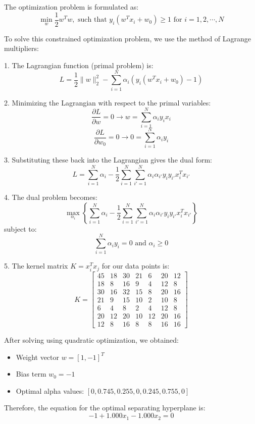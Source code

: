 \documentclass[12pt]{article}
\begin{document}
The optimization problem is formulated as:
\[
  \min_{w} \frac{1}{2}w^T w, \text{ such that } y_i(w^T x_i + w_0) \geq 1 \text{ for } i = 1,2,\cdots,N
\]

To solve this constrained optimization problem, we use the method of Lagrange multipliers:

1. The Lagrangian function (primal problem) is:
\[
  L = \frac{1}{2}\|w\|_2^2 - \sum_{i=1}^N \alpha_i(y_i(w^T x_i+w_0) - 1)
\]

2. Minimizing the Lagrangian with respect to the primal variables:
\[
  \frac{\partial L}{\partial w} = 0 \rightarrow w = \sum_{i=1}^N \alpha_i y_i x_i
\]
\[
  \frac{\partial L}{\partial w_0} = 0 \rightarrow 0 = \sum_{i=1}^N \alpha_i y_i
\]

3. Substituting these back into the Lagrangian gives the dual form:
\[
  L = \sum_{i=1}^N \alpha_i - \frac{1}{2}\sum_{i=1}^N\sum_{i'=1}^N \alpha_i\alpha_{i'}y_iy_{i'}x_i^T x_{i'}
\]

4. The dual problem becomes:
\[
  \max_{\alpha_i} \left\{\sum_{i=1}^N \alpha_i - \frac{1}{2}\sum_{i=1}^N\sum_{i'=1}^N \alpha_i\alpha_{i'}y_iy_{i'}x_i^T x_{i'}\right\}
\]
subject to:
\[
  \sum_{i=1}^N \alpha_i y_i = 0 \text{ and } \alpha_i \geq 0
\]

5. The kernel matrix \(K = x_i^T x_j\) for our data points is:
\[
  K = \begin{bmatrix}
    45 & 18 & 30 & 21 & 6  & 20 & 12 \\
    18 & 8  & 16 & 9  & 4  & 12 & 8  \\
    30 & 16 & 32 & 15 & 8  & 20 & 16 \\
    21 & 9  & 15 & 10 & 2  & 10 & 8  \\
    6  & 4  & 8  & 2  & 4  & 12 & 8  \\
    20 & 12 & 20 & 10 & 12 & 20 & 16 \\
    12 & 8  & 16 & 8  & 8  & 16 & 16
  \end{bmatrix}
\]

After solving using quadratic optimization, we obtained:
\begin{itemize}
  \item Weight vector \(w = [1, -1]^T\)
  \item Bias term \(w_0 = -1\)
  \item Optimal alpha values: $[0, 0.745,  0.255, 0, 0.245, 0.755, 0]$
\end{itemize}

Therefore, the equation for the optimal separating hyperplane is:
\[-1 + 1.000x_1 - 1.000x_2 = 0\]
\end{document}
